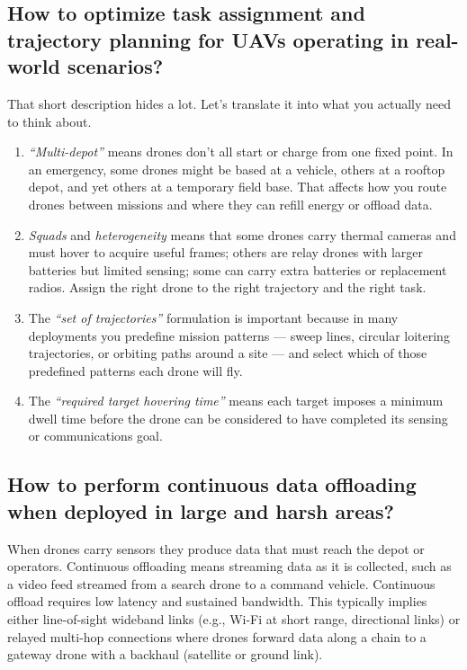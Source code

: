 \subsection{How to optimize task assignment and trajectory planning for UAVs operating in real-world scenarios?}
That short description hides a lot. Let’s translate it into what you actually need to think about.
\begin{enumerate}
    \item \textit{“Multi-depot”} means drones don’t all start or charge from one fixed point. In an emergency, some drones might be based at a vehicle, others at a rooftop depot, and yet others at a temporary field base. That affects how you route drones between missions and where they can refill energy or offload data.
    \item \textit{Squads} and \textit{heterogeneity} means that some drones carry thermal cameras and must hover to acquire useful frames; others are relay drones with larger batteries but limited sensing; some can carry extra batteries or replacement radios. Assign the right drone to the right trajectory and the right task.
    \item The \textit{“set of trajectories”} formulation is important because in many deployments you predefine mission patterns — sweep lines, circular loitering trajectories, or orbiting paths around a site — and select which of those predefined patterns each drone will fly.
    \item The \textit{“required target hovering time”} means each target imposes a minimum dwell time before the drone can be considered to have completed its sensing or communications goal.
\end{enumerate}

\subsection{How to perform continuous data offloading when deployed in large and harsh areas?}
When drones carry sensors they produce data that must reach the depot or operators.
Continuous offloading means streaming data as it is collected, such as a video feed streamed from a search drone to a command vehicle. Continuous offload requires low latency and sustained bandwidth. This typically implies either line-of-sight wideband links (e.g., Wi-Fi at short range, directional links) or relayed multi-hop connections where drones forward data along a chain to a gateway drone with a backhaul (satellite or ground link).


